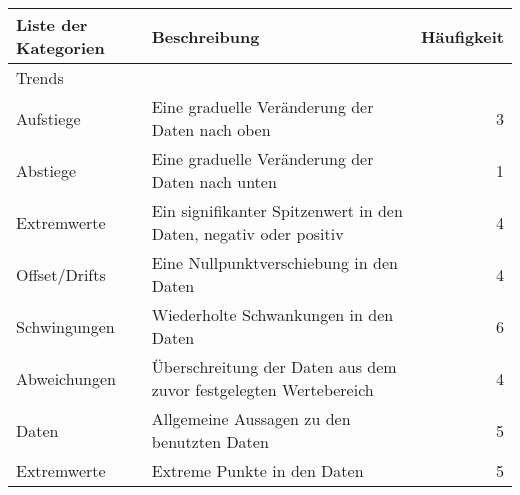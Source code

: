 \label{2:experteninterview_results}
\begin{table}[h!]
\begin{tabular}{p{4cm}|p{6.7cm}|r}
Liste der Kategorien                & Beschreibung                                                                                   & Häufigkeit \\ \hline \hline
Trends                               &                                                                                                &                                \\
\hspace{5mm}Aufstiege                            & Eine graduelle Veränderung der Daten nach oben                                                 & 3                              \\
\hspace{5mm}Abstiege                             & Eine graduelle Veränderung der Daten nach unten                                                & 1                              \\
\hspace{5mm}Extremwerte                                & Ein signifikanter Spitzenwert in den Daten, negativ oder positiv                                                     & 4                              \\
\hspace{5mm}Offset/Drifts                        & Eine Nullpunktverschiebung in den Daten                                                        & 4                              \\
\hspace{5mm}Schwingungen                         & Wiederholte Schwankungen in den Daten                                                          & 6                              \\
\hspace{5mm}Abweichungen                         & Überschreitung der Daten aus dem zuvor festgelegten Wertebereich                                    & 4                            \\ \hline  
Daten                                & Allgemeine Aussagen zu den benutzten Daten                                                      & 5                              \\
\hspace{5mm}Extremwerte                          & Extreme Punkte in den Daten                                                               & 5                              \\

\end{tabular}
\end{table}
